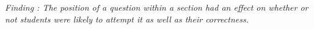 
\textit{Finding : The position of a question within a section had an effect on whether or not students were likely to attempt it as well as their correctness.} 

